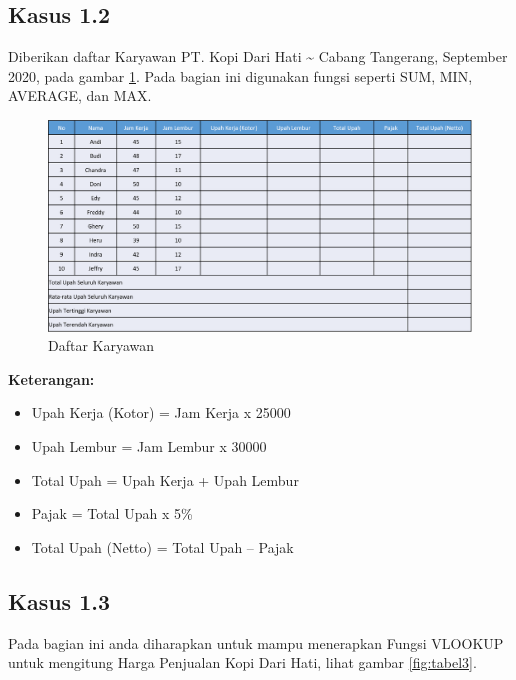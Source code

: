 \documentclass[
]{book}
\providecommand{\tightlist}{%
  \setlength{\itemsep}{0pt}\setlength{\parskip}{0pt}}
\begin{document}
\hypertarget{kasus-1.2}{%
\subsection*{Kasus 1.2}\label{kasus-1.2}}

Diberikan daftar Karyawan PT. Kopi Dari Hati \textasciitilde{} Cabang Tangerang, September 2020, pada gambar \ref{fig:tabel2}. Pada bagian ini digunakan fungsi seperti SUM, MIN, AVERAGE, dan MAX.

\begin{figure}

{\centering \includegraphics[width=1\linewidth]{images/tabel2} 

}

\caption{Daftar Karyawan}\label{fig:tabel2}
\end{figure}

\textbf{Keterangan:}

\begin{itemize}
\tightlist
\item
  Upah Kerja (Kotor) = Jam Kerja x 25000
\item
  Upah Lembur = Jam Lembur x 30000
\item
  Total Upah = Upah Kerja + Upah Lembur
\item
  Pajak = Total Upah x 5\%
\item
  Total Upah (Netto) = Total Upah -- Pajak
\end{itemize}

\hypertarget{kasus-1.3}{%
\subsection*{Kasus 1.3}\label{kasus-1.3}}

Pada bagian ini anda diharapkan untuk mampu menerapkan Fungsi VLOOKUP untuk mengitung Harga Penjualan Kopi Dari Hati, lihat gambar \ref{fig:tabel3}.
\end{document}
